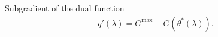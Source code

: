 \documentclass{article}
\begin{document}
Subgradient of the dual function
\begin{align}
q'(\lambda)
=
G^{\max}
-
G(\theta^*(\lambda)).
\end{align}





\end{document}
